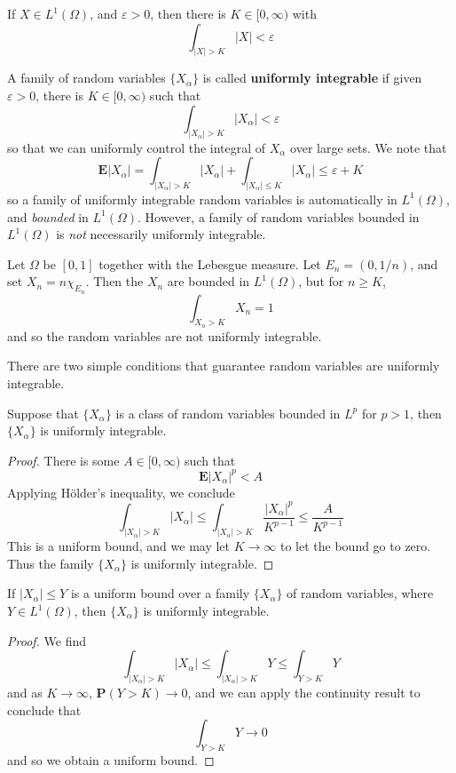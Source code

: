 \begin{corollary}
    If $X \in L^1(\Omega)$, and $\varepsilon > 0$, then there is $K \in [0,\infty)$ with
    \[ \int_{|X| > K} |X| < \varepsilon \]
\end{corollary}

A family of random variables $\{ X_\alpha \}$ is called {\bf uniformly integrable} if given $\varepsilon > 0$, there is $K \in [0,\infty)$ such that
%
\[ \int_{|X_\alpha| > K} |X_\alpha| < \varepsilon \]
%
so that we can uniformly control the integral of $X_\alpha$ over large sets. We note that
%
\[ \mathbf{E} |X_\alpha| = \int_{|X_\alpha| > K} |X_\alpha| + \int_{|X_\alpha| \leq K} |X_\alpha| \leq \varepsilon + K \]
%
so a family of uniformly integrable random variables is automatically in $L^1(\Omega)$, and {\it bounded} in $L^1(\Omega)$. However, a family of random variables bounded in $L^1(\Omega)$ is {\it not} necessarily uniformly integrable.

\begin{example}
    Let $\Omega$ be $[0,1]$ together with the Lebesgue measure. Let $E_n = (0,1/n)$, and set $X_n = n \chi_{E_n}$. Then the $X_n$ are bounded in $L^1(\Omega)$, but for $n \geq K$,
    \[ \int_{X_n > K} X_n = 1 \]
    and so the random variables are not uniformly integrable.
\end{example}

There are two simple conditions that guarantee random variables are uniformly integrable.

\begin{theorem}
    Suppose that $\{ X_\alpha \}$ is a class of random variables bounded in $L^p$ for $p > 1$, then $\{ X_\alpha \}$ is uniformly integrable.
\end{theorem}
\begin{proof}
    There is some $A \in [0,\infty)$ such that
    \[ \mathbf{E} |X_\alpha|^p < A \]
    Applying H\"{o}lder's inequality, we conclude
    \[ \int_{|X_\alpha| > K} |X_\alpha| \leq \int_{|X_\alpha| > K} \frac{|X_\alpha|^p}{K^{p-1}} \leq \frac{A}{K^{p-1}} \]
    This is a uniform bound, and we may let $K \to \infty$ to let the bound go to zero. Thus the family $\{ X_\alpha \}$ is uniformly integrable.
\end{proof}

\begin{corollary}
    If $|X_\alpha| \leq Y$ is a uniform bound over a family $\{ X_\alpha \}$ of random variables, where $Y \in L^1(\Omega)$, then $\{ X_\alpha \}$ is uniformly integrable.
\end{corollary}
\begin{proof}
    We find
    \[ \int_{|X_\alpha| > K} |X_\alpha| \leq \int_{|X_\alpha| > K} Y \leq \int_{Y > K} Y \]
    and as $K \to \infty$, $\mathbf{P}(Y > K) \to 0$, and we can apply the continuity result to conclude that
    \[ \int_{Y > K} Y \to 0 \]
    and so we obtain a uniform bound.
\end{proof}

